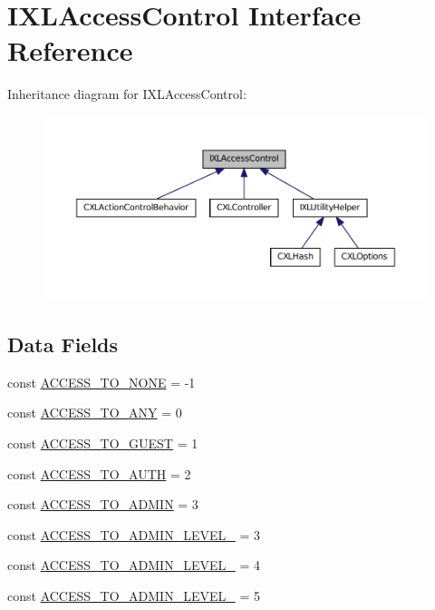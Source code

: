 \hypertarget{interfaceIXLAccessControl}{
\section{IXLAccessControl Interface Reference}
\label{interfaceIXLAccessControl}
}


Inheritance diagram for IXLAccessControl:\nopagebreak
\begin{figure}[H]
\begin{center}
\leavevmode
\includegraphics[width=400pt]{interfaceIXLAccessControl__inherit__graph}
\end{center}
\end{figure}
\subsection*{Data Fields}
\begin{DoxyCompactItemize}
\item 
const \hyperlink{group__constants__acl__indices_ga63d56389fe1e58d0b097471ca4f4dc00}{ACCESS\_\-TO\_\-NONE} = -\/1
\item 
const \hyperlink{group__constants__acl__indices_ga8b17406db740d630ae61ecf3cd9bbd8c}{ACCESS\_\-TO\_\-ANY} = 0
\item 
const \hyperlink{group__constants__acl__indices_gaaef8a39bfe4d39dca0f45fdb837a8d59}{ACCESS\_\-TO\_\-GUEST} = 1
\item 
const \hyperlink{group__constants__acl__indices_ga437b41cb9e13e41157d57e7736366295}{ACCESS\_\-TO\_\-AUTH} = 2
\item 
const \hyperlink{group__constants__acl__indices_ga16a362e48c9f7e6757bb15e0a3d9fa4f}{ACCESS\_\-TO\_\-ADMIN} = 3
\item 
const \hyperlink{group__constants__acl__indices_ga6a8da045f81793625a0cb332106e71ba}{ACCESS\_\-TO\_\-ADMIN\_\-LEVEL\_} = 3
\item 
const \hyperlink{group__constants__acl__indices_ga3b271ad21d11058b550be5ab9599cce3}{ACCESS\_\-TO\_\-ADMIN\_\-LEVEL\_} = 4
\item 
const \hyperlink{group__constants__acl__indices_gaff610796a797e6a609363e5ab6028ca0}{ACCESS\_\-TO\_\-ADMIN\_\-LEVEL\_} = 5
\end{DoxyCompactItemize}


